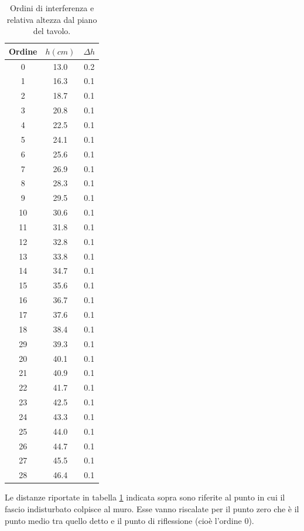 \documentclass[10pt,a4paper]{article}
\begin{document}
\begin{table}[!htb]
\centering
\begin{tabular}{|c|c|c|}
\hline
Ordine & $h (cm)$ & $ \Delta h$ \\
\hline
0	&	13.0	&	0.2\\
1	&	16.3	&	0.1\\
2	&	18.7	&	0.1\\
3	&	20.8	&	0.1\\
4	&	22.5	&	0.1\\
5	&	24.1	&	0.1\\
6	&	25.6	&	0.1\\
7	&	26.9	&	0.1\\
8	&	28.3	&	0.1\\
9	&	29.5	&	0.1\\
10	&	30.6	&	0.1\\
11	&	31.8	&	0.1\\
12	&	32.8	&	0.1\\
13	&	33.8	&	0.1\\
14	&	34.7	&	0.1\\
15	&	35.6	&	0.1\\
16	&	36.7	&	0.1\\
17	&	37.6	&	0.1\\
18	&	38.4	&	0.1\\
29	&	39.3	&	0.1\\
20	&	40.1	&	0.1\\
21	&	40.9	&	0.1\\
22	&	41.7	&	0.1\\
23	&	42.5	&	0.1\\
24	&	43.3	&	0.1\\
25	&	44.0	&	0.1\\
26	&	44.7	&	0.1\\
27	&	45.5	&	0.1\\
28	&	46.4	&	0.1\\
\hline
\end{tabular}
\caption{Ordini di interferenza e relativa altezza dal piano del tavolo.}
\label{Ordini}
\end{table}

Le distanze riportate in tabella \ref{Ordini} indicata sopra sono riferite al punto in cui il fascio indisturbato colpisce al muro. Esse vanno riscalate per il punto zero che è il punto medio tra quello detto e il punto di riflessione (cioè l'ordine 0).\\
\end{document}
